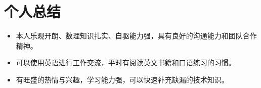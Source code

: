 \documentclass{resume}
\begin{document}
\section{个人总结}

\begin{itemize}
  \item 本人乐观开朗、数理知识扎实、自驱能力强，具有良好的沟通能力和团队合作精神。
  \item 可以使用英语进行工作交流，平时有阅读英文书籍和口语练习的习惯。
  \item 有旺盛的热情与兴趣，学习能力强，可以快速补充缺漏的技术知识。
\end{itemize}
\end{document}
